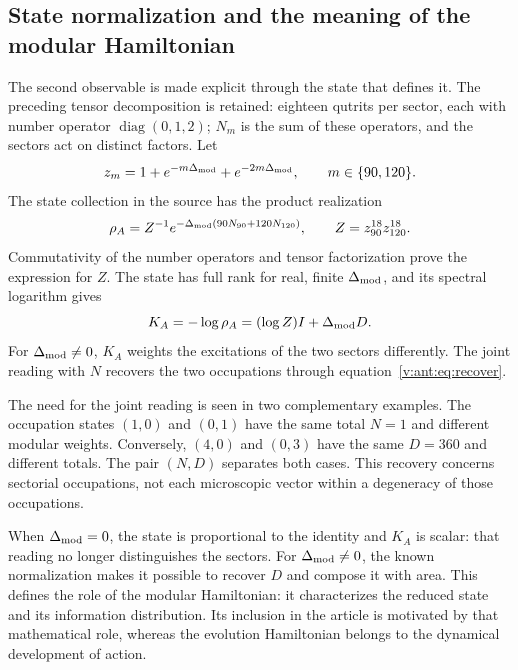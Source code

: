 \subsection{State normalization and the meaning of the modular Hamiltonian}
The second observable is made explicit through the state that defines it.
The preceding tensor decomposition is retained: eighteen qutrits
per sector, each with number operator $\operatorname{diag}(0,1,2)$;
$N_m$ is the sum of these operators, and the sectors act on distinct
factors. Let
\[
 z_m=1+e^{-m\Delta_{\rm mod}}+e^{-2m\Delta_{\rm mod}},
 \qquad m\in\{90,120\}.
\]
The state collection in the source has the product realization
\[
 \rho_A=Z^{-1}e^{-\Delta_{\rm mod}(90N_{90}+120N_{120})},
 \qquad Z=z_{90}^{18}z_{120}^{18}.
\]
Commutativity of the number operators and tensor factorization
prove the expression for $Z$. The state has full rank for real,
finite $\Delta_{\rm mod}$, and its spectral logarithm gives
\[
 K_A=-\log\rho_A=(\log Z)I+\Delta_{\rm mod}D.
\]
For $\Delta_{\rm mod}\ne0$, $K_A$ weights the excitations of the
two sectors differently. The joint reading with $N$ recovers the two occupations
through equation~\eqref{v:ant:eq:recover}.

The need for the joint reading is seen in two complementary examples.
The occupation states $(1,0)$ and $(0,1)$ have the same total $N=1$
and different modular weights. Conversely, $(4,0)$ and $(0,3)$ have
the same $D=360$ and different totals. The pair $(N,D)$ separates both
cases. This recovery concerns sectorial occupations, not
each microscopic vector within a degeneracy of those occupations.

When $\Delta_{\rm mod}=0$, the state is proportional to the identity
and $K_A$ is scalar: that reading no longer distinguishes the sectors.
For $\Delta_{\rm mod}\ne0$, the known normalization makes it possible to recover
$D$ and compose it with area. This defines the role of the modular
Hamiltonian: it characterizes the reduced state and its information distribution.
Its inclusion in the article is motivated by that mathematical role,
whereas the evolution Hamiltonian belongs to the dynamical development
of action.
